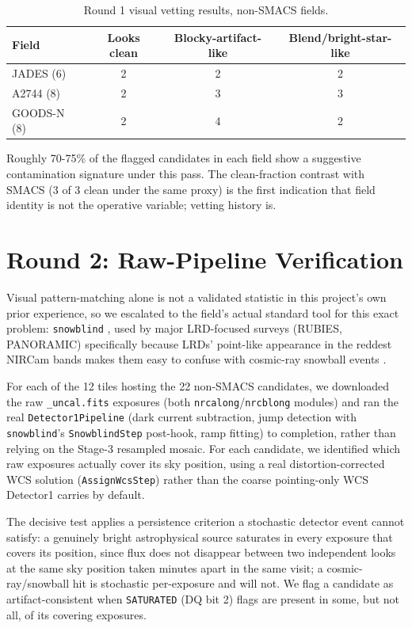 \documentclass[11pt]{article}
\begin{document}
\begin{table}[H]
\centering
\caption{Round 1 visual vetting results, non-SMACS fields.}
\label{tab:round1}
\begin{tabular}{lccc}
\toprule
Field & Looks clean & Blocky-artifact-like & Blend/bright-star-like \\
\midrule
JADES (6)    & 2 & 2 & 2 \\
A2744 (8)    & 2 & 3 & 3 \\
GOODS-N (8)  & 2 & 4 & 2 \\
\bottomrule
\end{tabular}
\end{table}

Roughly 70-75\% of the flagged candidates in each field show a suggestive
contamination signature under this pass. The clean-fraction contrast with SMACS
(3 of 3 clean under the same proxy) is the first indication that field identity
is not the operative variable; vetting history is.

\section{Round 2: Raw-Pipeline Verification}

Visual pattern-matching alone is not a validated statistic in this project's own
prior experience, so we escalated to the field's actual standard tool for this
exact problem: \texttt{snowblind} \cite{Davies2024snowblind}, used by major
LRD-focused surveys (RUBIES, PANORAMIC) specifically because LRDs' point-like
appearance in the reddest NIRCam bands makes them easy to confuse with cosmic-ray
snowball events \cite{Hviding2025}.

For each of the 12 tiles hosting the 22 non-SMACS candidates, we downloaded the
raw \texttt{\_uncal.fits} exposures (both \texttt{nrcalong}/\texttt{nrcblong}
modules) and ran the real \texttt{Detector1Pipeline} (dark current subtraction,
jump detection with \texttt{snowblind}'s \texttt{SnowblindStep} post-hook, ramp
fitting) to completion, rather than relying on the Stage-3 resampled mosaic. For
each candidate, we identified which raw exposures actually cover its sky
position, using a real distortion-corrected WCS solution (\texttt{AssignWcsStep})
rather than the coarse pointing-only WCS Detector1 carries by default.

The decisive test applies a persistence criterion a stochastic detector event
cannot satisfy: a genuinely bright astrophysical source saturates in every
exposure that covers its position, since flux does not disappear between two
independent looks at the same sky position taken minutes apart in the same visit;
a cosmic-ray/snowball hit is stochastic per-exposure and will not. We flag a
candidate as artifact-consistent when \texttt{SATURATED} (DQ bit 2) flags are
present in some, but not all, of its covering exposures.
\end{document}
